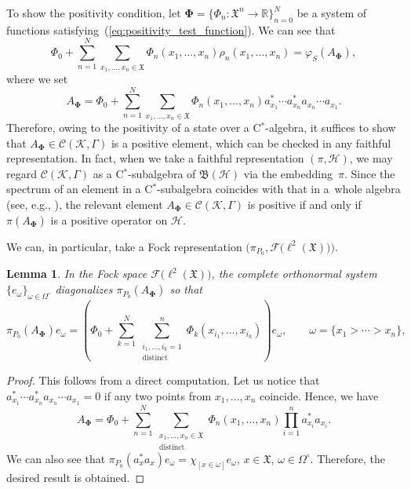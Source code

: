 \documentclass[pdftex]{sigma}
\numberwithin{equation}{section}
\newtheorem{Lemma}[Theorem]{Lemma}
\newcommand{\mfrak}[1]{\mathfrak{#1}}
\newcommand{\mcal}[1]{\mathcal{#1}}
\newcommand{\mbb}[1]{\mathbb{#1}}
\newcommand{\mrm}[1]{\mathrm{#1}}
\begin{document}
To show the positivity condition, let $\bm{\Phi}=\big\{\Phi_{n}\colon\mfrak{X}^{n}\to\mbb{R}\big\}_{n=0}^{N}$ be a system of functions satisfying~(\ref{eq:positivity_test_function}).
We can see that
\begin{equation*}
	\Phi_{0}+\sum_{n=1}^{N}\sum_{x_{1},\dots, x_{n}\in\mfrak{X}}\Phi_{n}(x_{1},\dots, x_{n})\rho_{n}(x_{1},\dots, x_{n})
	=\varphi_{S} (A_{\bm{\Phi}} ),
\end{equation*}
where we set
\begin{equation*}
	A_{\bm{\Phi}}=\Phi_{0}+\sum_{n=1}^{N}\sum_{x_{1},\dots,x_{n}\in\mfrak{X}}\Phi_{n}(x_{1},\dots,x_{n})a_{x_{1}}^{\ast}\cdots a_{x_{n}}^{\ast}a_{x_{n}}\cdots a_{x_{1}}.
\end{equation*}
Therefore, owing to the positivity of a state over a C$^{\ast}$-algebra, it suffices to show that $A_{\bm{\Phi}}\in\mcal{C}(\mcal{K},\Gamma)$ is a positive element, which can be checked in any faithful representation. In fact, when we take a faithful representation $(\pi,\mcal{H})$, we may regard $\mcal{C}(\mcal{K},\Gamma)$ as a C$^{\ast}$-subalgebra of $\mfrak{B}(\mcal{H})$ via the embedding~$\pi$. Since the spectrum of an element in a C$^{\ast}$-subalgebra coincides with that in a~whole algebra (see, e.g., \cite[Proposition~2.2.7]{BratteliRobinson1987}), the relevant element $A_{\bm{\Phi}}\in\mcal{C}(\mcal{K},\Gamma)$ is positive if and only if $\pi \left(A_{\bm{\Phi}}\right)$ is a positive operator on $\mcal{H}$.

We can, in particular, take a Fock representation $\big(\pi_{P_{0}},\mcal{F}\big(\ell^{2}(\mfrak{X})\big)\big)$.
\begin{Lemma}
In the Fock space $\mcal{F}\big(\ell^{2}(\mfrak{X})\big)$, the complete orthonormal system $\{e_{\omega}\}_{\omega\in\Omega^{\circ}}$ diagonalizes $\pi_{P_{0}} (A_{\bm{\Phi}} )$ so that
\begin{equation*}
	\pi_{P_{0}}\left(A_{\bm{\Phi}}\right) e_{\omega}=\left(\Phi_{0}+\sum_{k=1}^{N}\sum_{\substack{i_{1},\dots,i_{k}=1\\ \mrm{distinct}}}^{n}\Phi_{k}(x_{i_{1}},\dots, x_{i_{k}})\right) e_{\omega},\qquad \omega=\{x_{1}>\cdots >x_{n}\},
\end{equation*}
\end{Lemma}
\begin{proof}
This follows from a direct computation.
Let us notice that $a_{x_{1}}^{\ast}\cdots a_{x_{n}}^{\ast}a_{x_{n}}\cdots a_{x_{1}}=0$ if any two points from $x_{1},\dots, x_{n}$ coincide. Hence, we have
\begin{equation*}
	A_{\bm{\Phi}}=\Phi_{0}+\sum_{n=1}^{N}\sum_{\substack{x_{1},\dots,x_{n}\in\mfrak{X}\\ \mrm{distinct}}}\Phi_{n}(x_{1},\dots,x_{n})\prod_{i=1}^{n}a_{x_{i}}^{\ast}a_{x_{i}}.
\end{equation*}
We can also see that $\pi_{P_{0}}(a_{x}^{\ast}a_{x})e_{\omega}=\chi_{[x\in\omega]}e_{\omega}$, $x\in\mfrak{X}$, $\omega\in\Omega^{\circ}$. Therefore, the desired result is obtained.
\end{proof}
\end{document}
